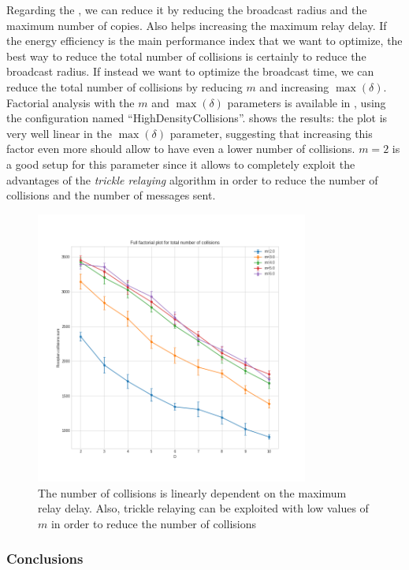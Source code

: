 Regarding the , we can reduce it by
reducing the broadcast radius and the maximum number of copies. Also helps
increasing the maximum relay delay. If the energy efficiency is the main
performance index that we want to optimize, the best way to reduce the total
number of collisions is certainly to reduce the broadcast radius. If instead we
want to optimize the broadcast time, we can reduce the total number of
collisions by reducing \(m\) and increasing \(\max(\delta)\). Factorial
analysis with the \(m\) and \(\max(\delta)\) parameters is available in
, using the configuration named
``HighDensityCollisions''.  shows the results: the
plot is very well linear in the \(\max(\delta)\) parameter, suggesting that
increasing this factor even more should allow to have even a lower number of
collisions. \(m\!=\!2\) is a good setup for this parameter since it allows to
completely exploit the advantages of the \emph{trickle relaying} algorithm in
order to reduce the number of collisions and the number of messages sent.

\begin{figure}[hbt]
	\centering
	\includegraphics[width=0.8\textwidth]{img/hd/collisions-D-ffplot}
	\caption{The number of collisions is linearly dependent on the maximum
	relay delay. Also, trickle relaying can be exploited with low values of
	\(m\) in order to reduce the number of
	collisions}\label{fig:hdcollisionsff}
\end{figure}

\subsubsection{Conclusions}\label{subsubsec:hdconclusions}

